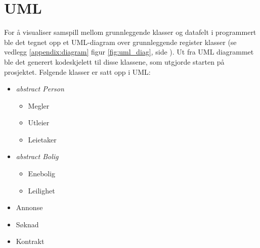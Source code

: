 \section{UML}
For å visualiser samspill mellom grunnleggende klasser og datafelt i programmert ble det tegnet opp et UML-diagram over grunnleggende register klasser (se vedlegg \ref{appendix:diagram} figur \ref{fig:uml_diag}, side \pageref{appendix:diagram}). Ut fra UML diagrammet ble det generert kodeskjelett til disse klassene, som utgjorde starten på prosjektet. Følgende klasser er satt opp i UML:
\begin{itemize}[noitemsep,nolistsep]
	\item \textit{abstract Person}
		\begin{itemize}
			\item Megler
			\item Utleier
			\item Leietaker
		\end{itemize}
	\item \textit{abstract Bolig}
		\begin{itemize}
			\item Enebolig
			\item Leilighet
		\end{itemize}
	\item Annonse
	\item Søknad
	\item Kontrakt
\end{itemize}


